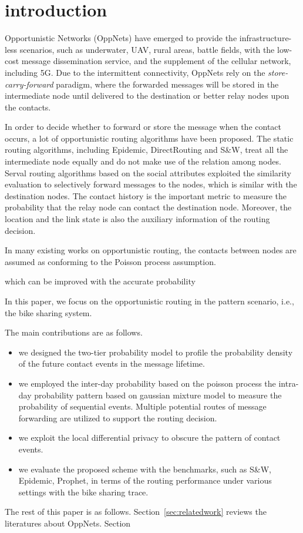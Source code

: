 \section{introduction}
\label{sec:introduction}
Opportunistic Networks (OppNets) have emerged to provide the infrastructure-less scenarios, 
such as underwater, UAV, rural areas, battle fields,
with the low-cost message dissemination service,
and the supplement of the cellular network, including 5G.
Due to the intermittent connectivity,
OppNets rely on the {\it store-carry-forward} paradigm,
where the forwarded messages will be stored in the intermediate node 
until delivered to the destination or better relay nodes upon the contacts.

In order to decide whether to forward or store the message when the contact occurs,
a lot of opportunistic routing algorithms have been proposed.
The static routing algorithms, including Epidemic, DirectRouting and S\&W, 
treat all the intermediate node equally
and do not make use of the relation among nodes. 
Serval routing algorithms based on the social attributes
exploited the similarity evaluation to selectively forward messages to the nodes,
which is similar with the destination nodes.
The contact history is the important metric to measure the probability 
that the relay node can contact the destination node.
Moreover, the location and the link state 
is also the auxiliary information of the routing decision.

In many existing works on opportunistic routing,
the contacts between nodes are assumed as conforming to the Poisson process assumption.

which can be improved with the accurate probability 


In this paper, we focus on the opportunistic routing in the pattern scenario, i.e., the bike sharing system.

The main contributions are as follows.
\begin{itemize}
\item {we designed the two-tier probability model
to profile the probability density of the future contact events
in the message lifetime.}
\item {we employed the inter-day probability based on the poisson process
the intra-day probability pattern based on gaussian mixture model
to measure the probability of sequential events.
Multiple potential routes of message forwarding
are utilized to support the routing decision.}
\item {we exploit the local differential privacy
to obscure the pattern of contact events.}
\item {we evaluate the proposed scheme with the benchmarks,
such as S\&W, Epidemic, Prophet,
in terms of the routing performance under various settings
with the bike sharing trace.}
\end{itemize}

The rest of this paper is as follows.
Section~\ref{sec:relatedwork} reviews the literatures about OppNets.
Section 
